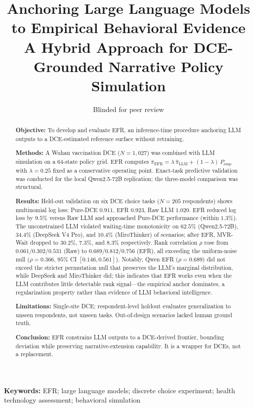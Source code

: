 \documentclass[12pt]{article}
\title{\textbf{Anchoring Large Language Models to Empirical Behavioral Evidence}\\[0.5em]
\large A Hybrid Approach for DCE-Grounded Narrative Policy Simulation}
\author{Blinded for peer review}
\date{}
\newcommand{\keywords}[1]{\vspace{0.5em}\noindent\textbf{Keywords:} #1}
\begin{document}
\maketitle


\begin{abstract}\justifying
\textbf{Objective:} To develop and evaluate EFR, an inference-time procedure anchoring LLM outputs to a DCE-estimated reference surface without retraining.

\textbf{Methods:} A Wuhan vaccination DCE ($N\!=\!1{,}027$) was combined with LLM simulation on a 64-state policy grid. EFR computes $\pi_{\text{EFR}} = \lambda\,\bar\pi_{\text{LLM}} + (1-\lambda)\,P_{\text{emp}}$ with $\lambda\!=\!0.25$ fixed as a conservative operating point. Exact-task predictive validation was conducted for the local Qwen2.5-72B replication; the three-model comparison was structural.

\textbf{Results:} Held-out validation on six DCE choice tasks ($N=205$ respondents) shows multinomial log loss: Pure-DCE $0.911$, EFR $0.923$, Raw LLM $1.020$. EFR reduced log loss by $9.5\%$ versus Raw LLM and approached Pure-DCE performance (within $1.3\%$). The unconstrained LLM violated waiting-time monotonicity on $62.5\%$ (Qwen2.5-72B), $34.4\%$ (DeepSeek V4 Pro), and $10.4\%$ (MiroThinker) of scenarios; after EFR, MVR-Wait dropped to $30.2\%$, $7.3\%$, and $8.3\%$ respectively. Rank correlation $\rho$ rose from $0.061$/$0.302$/$0.531$ (Raw) to $0.689$/$0.812$/$0.756$ (EFR), all exceeding the uniform-noise null ($\rho\!=\!0.366$, $95\%$ CI $[0.146, 0.561]$). Notably, Qwen EFR ($\rho\!=\!0.689$) did not exceed the stricter permutation null that preserves the LLM's marginal distribution, while DeepSeek and MiroThinker did; this indicates that EFR works even when the LLM contributes little detectable rank signal---the empirical anchor dominates, a regularization property rather than evidence of LLM behavioral intelligence.

\textbf{Limitations:} Single-site DCE; respondent-level holdout evaluates generalization to unseen respondents, not unseen tasks. Out-of-design scenarios lacked human ground truth.

\textbf{Conclusion:} EFR constrains LLM outputs to a DCE-derived frontier, bounding deviation while preserving narrative-extension capability. It is a wrapper for DCEs, not a replacement.
\end{abstract}


\keywords{EFR; large language models; discrete choice experiment; health technology assessment; behavioral simulation}
\end{document}
